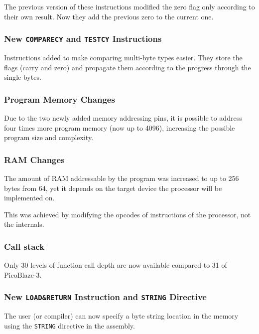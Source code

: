         The previous version of these instructions modified the zero flag only according to their own result. Now they add the previous zero to the current one.

        \subsubsection{New \texttt{COMPARECY} and \texttt{TESTCY} Instructions}

        Instructions added to make comparing multi-byte types easier. They store the flags (carry and zero) and propagate them according to the progress through the single bytes.

        \subsubsection{Program Memory Changes}

        Due to the two newly added memory addressing pins, it is possible to address four times more program memory (now up to 4096), increasing the possible program size and complexity.

        \subsubsection{RAM Changes}

        The amount of RAM addressable by the program was increased to up to 256 bytes from 64, yet it depends on the target device the processor will be implemented on. 

        This was achieved by modifying the opcodes of instructions of the processor, not the internals.

        \subsubsection{Call stack}

        Only 30 levels of function call depth are now available compared to 31 of PicoBlaze-3.

        \subsubsection{New \texttt{LOAD\&RETURN} Instruction and \texttt{STRING} Directive}

        The user (or compiler) can now specify a byte string location in the memory using the \texttt{STRING} directive in the assembly.

